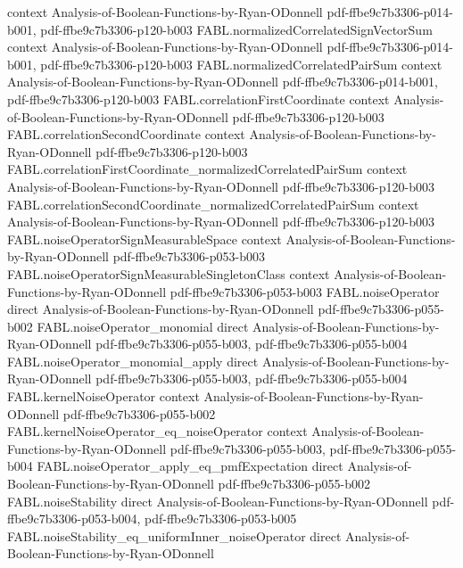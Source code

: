 \begin{theorem}
  {context}
  {Analysis-of-Boolean-Functions-by-Ryan-ODonnell}
  {pdf-ffbe9c7b3306-p014-b001,
    pdf-ffbe9c7b3306-p120-b003}
\proofstep
  {FABL.normalizedCorrelatedSignVectorSum}
  {context}
  {Analysis-of-Boolean-Functions-by-Ryan-ODonnell}
  {pdf-ffbe9c7b3306-p014-b001,
    pdf-ffbe9c7b3306-p120-b003}
\proofstep
  {FABL.normalizedCorrelatedPairSum}
  {context}
  {Analysis-of-Boolean-Functions-by-Ryan-ODonnell}
  {pdf-ffbe9c7b3306-p014-b001,
    pdf-ffbe9c7b3306-p120-b003}
\proofstep
  {FABL.correlationFirstCoordinate}
  {context}
  {Analysis-of-Boolean-Functions-by-Ryan-ODonnell}
  {pdf-ffbe9c7b3306-p120-b003}
\proofstep
  {FABL.correlationSecondCoordinate}
  {context}
  {Analysis-of-Boolean-Functions-by-Ryan-ODonnell}
  {pdf-ffbe9c7b3306-p120-b003}
\proofstep
  {FABL.correlationFirstCoordinate_normalizedCorrelatedPairSum}
  {context}
  {Analysis-of-Boolean-Functions-by-Ryan-ODonnell}
  {pdf-ffbe9c7b3306-p120-b003}
\proofstep
  {FABL.correlationSecondCoordinate_normalizedCorrelatedPairSum}
  {context}
  {Analysis-of-Boolean-Functions-by-Ryan-ODonnell}
  {pdf-ffbe9c7b3306-p120-b003}
\proofstep
  {FABL.noiseOperatorSignMeasurableSpace}
  {context}
  {Analysis-of-Boolean-Functions-by-Ryan-ODonnell}
  {pdf-ffbe9c7b3306-p053-b003}
\proofstep
  {FABL.noiseOperatorSignMeasurableSingletonClass}
  {context}
  {Analysis-of-Boolean-Functions-by-Ryan-ODonnell}
  {pdf-ffbe9c7b3306-p053-b003}
\proofstep
  {FABL.noiseOperator}
  {direct}
  {Analysis-of-Boolean-Functions-by-Ryan-ODonnell}
  {pdf-ffbe9c7b3306-p055-b002}
\proofstep
  {FABL.noiseOperator_monomial}
  {direct}
  {Analysis-of-Boolean-Functions-by-Ryan-ODonnell}
  {pdf-ffbe9c7b3306-p055-b003,
    pdf-ffbe9c7b3306-p055-b004}
\proofstep
  {FABL.noiseOperator_monomial_apply}
  {direct}
  {Analysis-of-Boolean-Functions-by-Ryan-ODonnell}
  {pdf-ffbe9c7b3306-p055-b003,
    pdf-ffbe9c7b3306-p055-b004}
\proofstep
  {FABL.kernelNoiseOperator}
  {context}
  {Analysis-of-Boolean-Functions-by-Ryan-ODonnell}
  {pdf-ffbe9c7b3306-p055-b002}
\proofstep
  {FABL.kernelNoiseOperator_eq_noiseOperator}
  {context}
  {Analysis-of-Boolean-Functions-by-Ryan-ODonnell}
  {pdf-ffbe9c7b3306-p055-b003,
    pdf-ffbe9c7b3306-p055-b004}
\proofstep
  {FABL.noiseOperator_apply_eq_pmfExpectation}
  {direct}
  {Analysis-of-Boolean-Functions-by-Ryan-ODonnell}
  {pdf-ffbe9c7b3306-p055-b002}
\proofstep
  {FABL.noiseStability}
  {direct}
  {Analysis-of-Boolean-Functions-by-Ryan-ODonnell}
  {pdf-ffbe9c7b3306-p053-b004,
    pdf-ffbe9c7b3306-p053-b005}
\proofstep
  {FABL.noiseStability_eq_uniformInner_noiseOperator}
  {direct}
  {Analysis-of-Boolean-Functions-by-Ryan-ODonnell}

\end{theorem}
